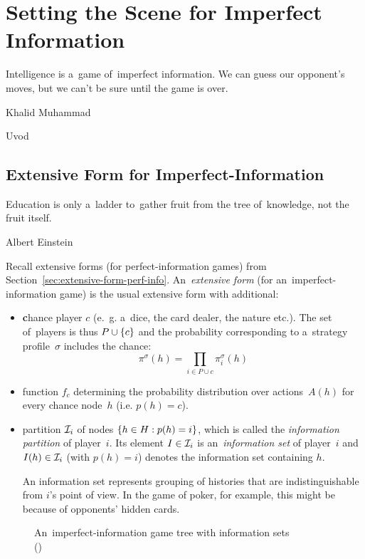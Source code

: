 \chapter{Setting the Scene for Imperfect Information}
\epigraph{
  Intelligence is a~game of~imperfect information.
  We can guess our opponent's moves, but we can't be sure until the game is over.
}{Khalid Muhammad}
\todo Uvod

\section{Extensive Form for Imperfect-Information}
\label{sec:extensive-form-imperf-info}
\epigraph{
  Education is only a~ladder to~gather fruit from the tree of~knowledge, not the fruit itself.
}{Albert Einstein}
Recall extensive forms (for perfect-information games) from Section~\ref{sec:extensive-form-perf-info}.
An~\emph{extensive form} (for an~imperfect-information game) is the usual extensive form with additional:
\begin{itemize}
  \item \textbf{c}hance player $c$ (e.~g. a~dice, the card dealer, the nature etc.).
    The set of~players is thus $P \cup \left\{ c \right\}$ and the probability corresponding to a~strategy profile~$\sigma$ includes the chance:
    \[\pi ^\sigma(h) = \prod _{i \in P \cup {c}} \pi _i ^\sigma (h)\]

  \item function $f_c$ determining the probability distribution over actions~$A(h)$ for every chance node~$h$ (i.e. $p(h) = c$).

  \item partition $\mathcal{I}_i$ of nodes $\left\{ h \in H: p(h) = i \right\}$, which is called the \emph{information partition} of player~$i$.
    Its element $I \in \mathcal{I}_i$ is an~\emph{information set} of player~$i$ and $I(h) \in \mathcal{I}_i$ (with $p(h) = i$) denotes the information set containing $h$.

    An information set represents grouping of histories that are indistinguishable from $i$'s point of view.
    In the game of poker, for example, this might be because of  opponents' hidden cards.
\end{itemize}
\noindent
\begin{figure}[H]
  \centering
  \scriptsize
  \def\svgwidth{.7\textwidth}
  
  \def\captionTitle{An~imperfect-information game tree with information sets}
  \caption[\captionTitle]{\captionTitle{} \\(\cite[p.~67]{AGT07})}
  \label{fig:strategic-form-tree}
\end{figure}

